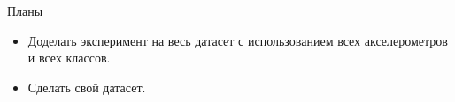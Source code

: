 \documentclass{beamer}
\begin{document}

\begin{frame}{Планы}

    \begin{itemize}

        \item Доделать эксперимент на весь датасет с использованием всех акселерометров и всех классов.
    
        \item Сделать свой датасет.
        
    \end{itemize}
    
\end{frame}

\end{document}
